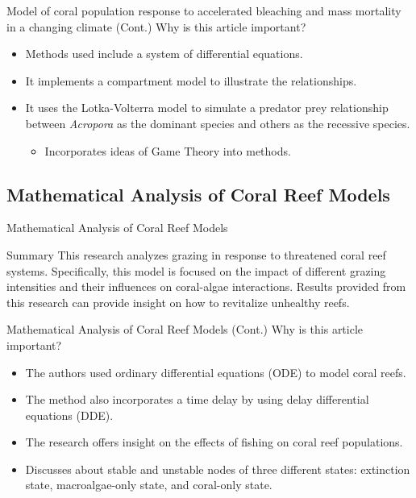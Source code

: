 \documentclass{beamer}
\begin{document}
\begin{frame}{Model of coral population response to accelerated bleaching and mass
mortality in a changing climate (Cont.)}
    Why is this article important?
    \begin{itemize}
        \item Methods used include a system of differential equations.
        \item It implements a compartment model to illustrate the relationships.
        \item It uses the Lotka-Volterra model to simulate a predator prey relationship between \textit{Acropora} as the dominant species and others as the recessive species.
        \begin{itemize}
            \item Incorporates ideas of Game Theory into methods.
        \end{itemize}
    \end{itemize}
\end{frame}

\subsection{Mathematical Analysis of Coral Reef Models}
\begin{frame}{Mathematical Analysis of Coral Reef Models \cite{mathanalysis}}
    \begin{block}{Summary}
        This research analyzes grazing in response to threatened coral reef systems. Specifically, this model is focused on the impact of different grazing intensities and their influences on coral-algae interactions. Results provided from this research can provide insight on how to revitalize unhealthy reefs.
    \end{block}
\end{frame}

\begin{frame}{Mathematical Analysis of Coral Reef Models (Cont.)}
    Why is this article important?
    \begin{itemize}
        \item The authors used ordinary differential equations (ODE) to model coral reefs.
        \item The method also incorporates a time delay by using delay differential equations (DDE).
        \item The research offers insight on the effects of fishing on coral reef populations.
        \item Discusses about stable and unstable nodes of three different states: extinction state, macroalgae-only state, and coral-only state.
    \end{itemize}
\end{frame}
\end{document}
